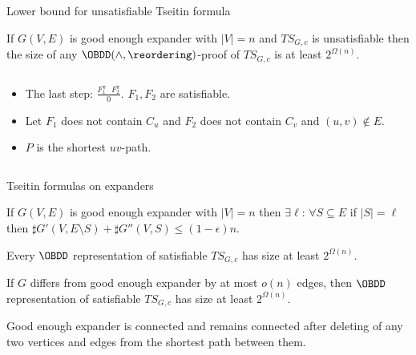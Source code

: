 \begin{frame}{Lower bound for unsatisfiable Tseitin formula}
    \begin{theorem}
    	If $G(V, E)$ is good enough expander with $|V| = n$ and $TS_{G, c}$ is unsatisfiable then the
        size of any $\OBDD(\land, \reordering)$-proof of $TS_{G, c}$ is at least $2^{\Omega(n)}$.
    \end{theorem}

    \pause

	\begin{columns}[t]
		\begin{column}{0.4\textwidth}
            \begin{itemize}
                \item The last step: $\frac{F_1^{\pi} ~~~ F_2^{\pi}}{0}$. $F_1, F_2$ are satisfiable.
                \item Let $F_1$ does not contain $C_u$ and $F_2$ does not contain $C_v$ and $(u, v)
                    \notin E$.
                \item $P$ is the shortest $uv$-path.
            \end{itemize}    
        \end{column}
        
		\begin{column}{0.5\textwidth}
            
		\end{column}
	\end{columns}
\end{frame}

\begin{frame}{Tseitin formulas on expanders}
    \begin{theorem}
        If $G(V, E)$ is good enough expander with $|V| = n$ then $\exists \ell$: $\forall S \subseteq E$
        if $|S| = \ell$ then $\sharp G'(V, E \setminus S) + \sharp G''(V, S) \le (1 - \epsilon) n$.
    \end{theorem}

    \pause

    \begin{corollary}
        Every $\OBDD$ representation of satisfiable $TS_{G, c}$ has size at least $2^{\Omega(n)}$.
    \end{corollary}

    \pause

    \begin{corollary}
        If $G$ differs from good enough expander by at most $o(n)$ edges, then $\OBDD$ representation of
        satisfiable $TS_{G, c}$ has size at least $2^{\Omega(n)}$.
    \end{corollary}

    \begin{lemma}
        Good enough expander is connected and remains connected after deleting of any two vertices and
        edges from the shortest path between them.
    \end{lemma}
\end{frame}


